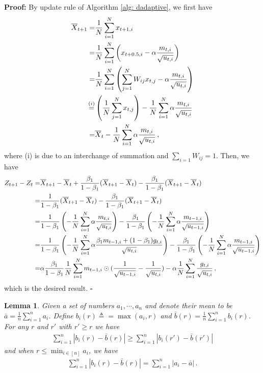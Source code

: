 \documentclass{article} %
\newtheorem{lemma}{Lemma}
\begin{document}
\textbf{Proof:} By update rule of Algorithm \ref{alg: dadaptive}, we first have
\begin{align}\notag
\begin{split}
\overline X_{t+1}  = & \frac{1}{N}\sum_{i=1}^N x_{t+1,i}  \\
= & \frac{1}{N}\sum_{i=1}^N \left( x_{t+0.5,i} - \alpha \frac{m_{t,i}}{\sqrt{u_{t,i}}}\right)  \\
= & \frac{1}{N}\sum_{i=1}^N \left(  \sum_{j=1}^N W_{ij}x_{t,j} - \alpha \frac{m_{t,i}}{\sqrt{u_{t,i}}}\right)    \\
\overset{(i)}{=} &  \left(\frac{1}{N} \sum_{j=1}^N x_{t,j} \right) -\frac{1}{N} \sum_{i=1}^N   \alpha \frac{m_{t,i}}{\sqrt{u_{t,i}}}  \\
= & \overline X_t - \frac{1}{N} \sum_{i=1}^N   \alpha \frac{m_{t,i}}{\sqrt{u_{t,i}}} \, ,
\end{split}
\end{align}
where (i) is due to an interchange of summation and $\sum_{i=1} W_{ij} = 1$.
Then, we have 
\begin{align}\notag
\begin{split}
Z_{t+1} - Z_t =& \overline X_{t+1} - \overline X_{t} + \frac{\beta_1}{1-\beta_1} (\overline X_{t+1}- \overline X_t) - \frac{\beta_1}{1-\beta_1} (\overline X_{t+1}- \overline X_t)  \\
= &  \frac{1}{1-\beta_1} (\overline X_{t+1}- \overline X_t) - \frac{\beta_1}{1-\beta_1} (\overline X_{t+1}- \overline X_t)  \\
= & \frac{1}{1-\beta_1} \left(- \frac{1}{N} \sum_{i=1}^N   \alpha \frac{m_{t,i}}{\sqrt{u_{t,i}}}\right) - \frac{\beta_1}{1-\beta_1} \left(- \frac{1}{N} \sum_{i=1}^N   \alpha \frac{m_{t-1,i}}{\sqrt{u_{t-1,i}}}\right)  \\
= & \frac{1}{1-\beta_1} \left(- \frac{1}{N} \sum_{i=1}^N   \alpha \frac{\beta_1 m_{t-1,i} + (1-\beta_1) g_{t,i}}{\sqrt{u_{t,i}}}\right) - \frac{\beta_1}{1-\beta_1} \left(- \frac{1}{N} \sum_{i=1}^N   \alpha \frac{m_{t-1,i}}{\sqrt{u_{t-1,i}}}\right)  \\
= & \alpha \frac{\beta_1}{1-\beta_1}  \frac{1}{N} \sum_{i=1}^N m_{t-1	,i} \odot (\frac{1}{\sqrt{u_{t-1,i}}} - \frac{1}{\sqrt{u_{t,i}}}) - \alpha \frac{1}{N} \sum_{i=1}^N \frac{g_{t,i}}{\sqrt{u_{t,i}}} \, ,
\end{split}
\end{align}
which is the desired result. \hfill $\square$


\begin{lemma}\label{lem: mean_after_max}
	Given  a set of numbers $a_1,\cdots,a_n$ and denote their mean to be $\bar a = \frac{1}{n}\sum_{i=1}^n a_i$. Define $b_i(r) \triangleq = \max(a_i,r)$ and $\bar b (r) =  \frac{1}{n}\sum_{i=1}^n b_i(r)$. For any $r$ and $r'$ with $r' \geq r$ we have 
	\begin{align}\label{eq: r_decrease}
	\sum_{i=1}^n |b_i(r) - \bar b(r)| \geq \sum_{i=1}^n |b_i(r') - \bar b(r')|
	\end{align}
	and when $r \leq \min_{i \in [n]} a_i$, we have
	\begin{align}\label{eq: r_reduce}
	\sum_{i=1}^n |b_i(r) - \bar b(r)| =   \sum_{i=1}^n |a_i - \bar a| \, .
	\end{align}
\end{lemma}
\end{document}
